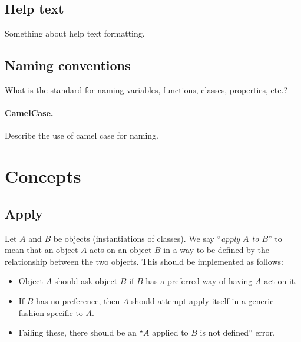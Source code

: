 \documentclass[12pt]{article}
\begin{document}
\subsection{Help text}
Something about help text formatting.

\subsection{Naming conventions}
What is the standard for naming variables, functions, classes, properties, etc.?

\paragraph{CamelCase.} Describe the use of camel case for naming.

\section{Concepts}
\subsection{Apply}
Let $A$ and $B$ be objects (instantiations of classes). We say ``\emph{apply $A$ to $B$}'' to mean that an object $A$ acts on an object $B$ in a way to be defined by the relationship between the two objects. This should be implemented as follows:
\begin{itemize}
  \item Object $A$ should ask object $B$ if $B$ has a preferred way of having $A$ act on it.
  \item If $B$ has no preference, then $A$ should attempt apply itself in a generic fashion specific to $A$.
  \item Failing these, there should be an ``$A$ applied to $B$ is not defined'' error.
\end{itemize}
\end{document}
